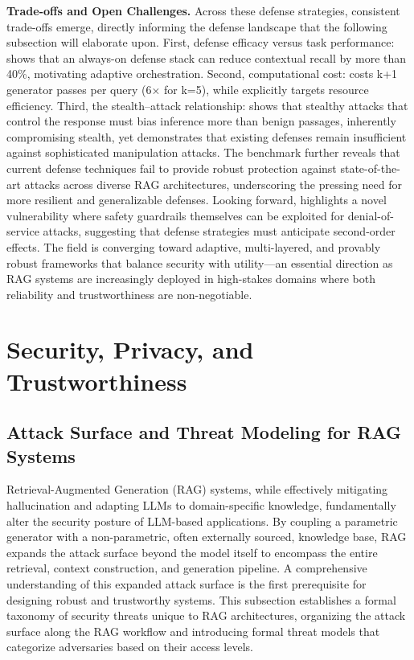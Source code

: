 \documentclass[11pt]{article}
\begin{document}
\textbf{Trade-offs and Open Challenges.} Across these defense strategies, consistent trade-offs emerge, directly informing the defense landscape that the following subsection will elaborate upon. First, defense efficacy versus task performance: \cite{ref457} shows that an always-on defense stack can reduce contextual recall by more than 40\%, motivating adaptive orchestration. Second, computational cost: \cite{ref450} costs k+1 generator passes per query (6× for k=5), while \cite{ref454} explicitly targets resource efficiency. Third, the stealth--attack relationship: \cite{ref448} shows that stealthy attacks that control the response must bias inference more than benign passages, inherently compromising stealth, yet \cite{ref433} demonstrates that existing defenses remain insufficient against sophisticated manipulation attacks. The benchmark \cite{ref439} further reveals that current defense techniques fail to provide robust protection against state-of-the-art attacks across diverse RAG architectures, underscoring the pressing need for more resilient and generalizable defenses. Looking forward, \cite{ref69} highlights a novel vulnerability where safety guardrails themselves can be exploited for denial-of-service attacks, suggesting that defense strategies must anticipate second-order effects. The field is converging toward adaptive, multi-layered, and provably robust frameworks that balance security with utility---an essential direction as RAG systems are increasingly deployed in high-stakes domains where both reliability and trustworthiness are non-negotiable.

\section{Security, Privacy, and Trustworthiness}

\subsection{Attack Surface and Threat Modeling for RAG Systems}

Retrieval-Augmented Generation (RAG) systems, while effectively mitigating hallucination and adapting LLMs to domain-specific knowledge, fundamentally alter the security posture of LLM-based applications. By coupling a parametric generator with a non-parametric, often externally sourced, knowledge base, RAG expands the attack surface beyond the model itself to encompass the entire retrieval, context construction, and generation pipeline. A comprehensive understanding of this expanded attack surface is the first prerequisite for designing robust and trustworthy systems. This subsection establishes a formal taxonomy of security threats unique to RAG architectures, organizing the attack surface along the RAG workflow and introducing formal threat models that categorize adversaries based on their access levels.
\end{document}
